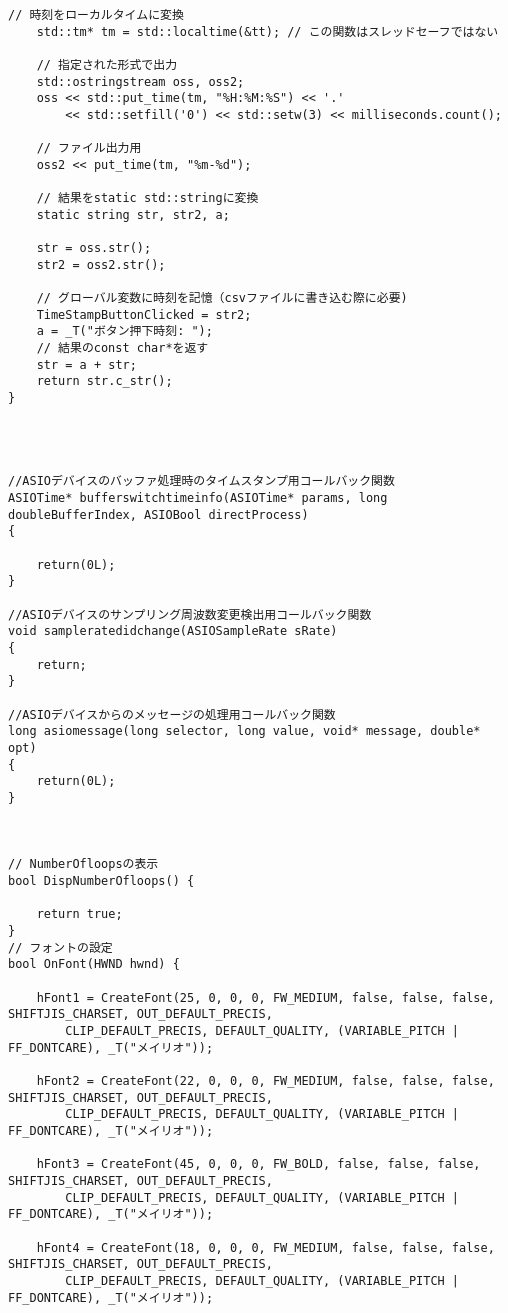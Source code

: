 \begin{lstlisting}[caption=main.cpp]
	// 時刻をローカルタイムに変換
	std::tm* tm = std::localtime(&tt); // この関数はスレッドセーフではない

	// 指定された形式で出力
	std::ostringstream oss, oss2;
	oss << std::put_time(tm, "%H:%M:%S") << '.'
		<< std::setfill('0') << std::setw(3) << milliseconds.count();

	// ファイル出力用
	oss2 << put_time(tm, "%m-%d");

	// 結果をstatic std::stringに変換
	static string str, str2, a;
	
	str = oss.str();
	str2 = oss2.str();

	// グローバル変数に時刻を記憶（csvファイルに書き込む際に必要)
	TimeStampButtonClicked = str2;
	a = _T("ボタン押下時刻: ");
	// 結果のconst char*を返す
	str = a + str;
	return str.c_str();
}




//ASIOデバイスのバッファ処理時のタイムスタンプ用コールバック関数
ASIOTime* bufferswitchtimeinfo(ASIOTime* params, long doubleBufferIndex, ASIOBool directProcess)
{
	
	return(0L);
}

//ASIOデバイスのサンプリング周波数変更検出用コールバック関数
void sampleratedidchange(ASIOSampleRate sRate)
{
	return;
}

//ASIOデバイスからのメッセージの処理用コールバック関数
long asiomessage(long selector, long value, void* message, double* opt)
{
	return(0L);
}



// NumberOfloopsの表示
bool DispNumberOfloops() {

	return true;
}
// フォントの設定
bool OnFont(HWND hwnd) {

	hFont1 = CreateFont(25, 0, 0, 0, FW_MEDIUM, false, false, false, SHIFTJIS_CHARSET, OUT_DEFAULT_PRECIS,
		CLIP_DEFAULT_PRECIS, DEFAULT_QUALITY, (VARIABLE_PITCH | FF_DONTCARE), _T("メイリオ"));

	hFont2 = CreateFont(22, 0, 0, 0, FW_MEDIUM, false, false, false, SHIFTJIS_CHARSET, OUT_DEFAULT_PRECIS,
		CLIP_DEFAULT_PRECIS, DEFAULT_QUALITY, (VARIABLE_PITCH | FF_DONTCARE), _T("メイリオ"));

	hFont3 = CreateFont(45, 0, 0, 0, FW_BOLD, false, false, false, SHIFTJIS_CHARSET, OUT_DEFAULT_PRECIS,
		CLIP_DEFAULT_PRECIS, DEFAULT_QUALITY, (VARIABLE_PITCH | FF_DONTCARE), _T("メイリオ"));

	hFont4 = CreateFont(18, 0, 0, 0, FW_MEDIUM, false, false, false, SHIFTJIS_CHARSET, OUT_DEFAULT_PRECIS,
		CLIP_DEFAULT_PRECIS, DEFAULT_QUALITY, (VARIABLE_PITCH | FF_DONTCARE), _T("メイリオ"));


\end{lstlisting}
